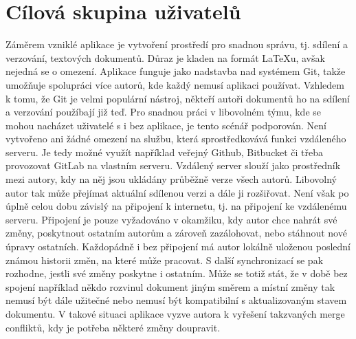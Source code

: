 \chapter{Cílová skupina uživatelů}

Záměrem vzniklé aplikace je vytvoření prostředí pro snadnou správu, tj. sdílení a verzování, textových dokumentů.
Důraz je kladen na formát LaTeXu, avšak nejedná se o omezení. Aplikace funguje jako nadstavba nad systémem Git, takže umožňuje spolupráci více autorů, kde každý nemusí aplikaci používat. Vzhledem k tomu, že Git je velmi populární nástroj,
někteří autoři dokumentů ho na sdílení a verzování použíbají již teď. Pro snadnou práci v libovolném týmu, kde se mohou nacházet uživatelé s i bez aplikace, je tento scénář podporován. Není vytvořeno ani žádné omezení na službu, která sprostředkovává funkci vzdáleného serveru.
Je tedy možné využít například veřejný Github, Bitbucket či třeba provozovat GitLab na vlastním serveru. Vzdálený server slouží jako prostředník mezi autory, kdy na něj jsou ukládány průběžně verze všech autorů. Libovolný autor tak může přejímat aktuální sdílenou verzi a dále ji rozšiřovat. Není však po úplně celou dobu závislý na připojení k internetu, tj. na připojení ke vzdálenému serveru. Připojení je pouze vyžadováno v okamžiku, kdy autor chce nahrát své změny, poskytnout ostatním autorům a zároveň zazálohovat, nebo stáhnout nové úpravy ostatních.
Každopádně i bez připojení má autor lokálně uloženou poslední známou historii změn, na které může pracovat. S další synchronizací se pak rozhodne, jestli své změny poskytne i ostatním. Může se totiž stát, že v době bez spojení například někdo rozvinul dokument jiným směrem a místní změny tak nemusí být dále užitečné nebo nemusí být kompatibilní s aktualizovaným stavem dokumentu. V takové situaci aplikace vyzve autora k vyřešení takzvaných merge confliktů, kdy je potřeba některé změny doupravit.
